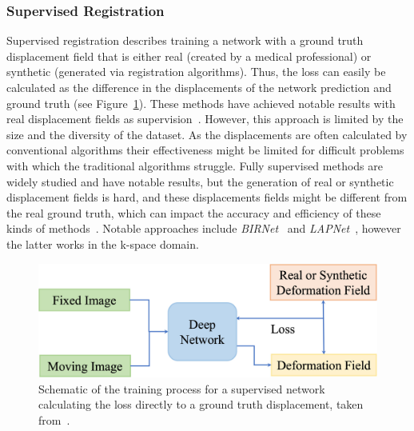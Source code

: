 \subsubsection{Supervised Registration} \label{SubSubSec:SupervisedRegistration}
Supervised registration describes training a network with a ground truth displacement field that is either real (created by a medical professional) or synthetic (generated via registration algorithms). Thus, the loss can easily be calculated as the difference in the displacements of the network prediction and ground truth (see Figure~\ref{fig:SupervisedRegistration}). These methods have achieved notable results with real displacement fields as supervision~\cite{Zou2022}. However, this approach is limited by the size and the diversity of the dataset. As the displacements are often calculated by conventional algorithms their effectiveness might be limited for difficult problems with which the traditional algorithms struggle. Fully supervised methods are widely studied and have notable results, but the generation of real or synthetic displacement fields is hard, and these displacements fields might be different from the real ground truth, which can impact the accuracy and efficiency of these kinds of methods~\cite{Zou2022}. Notable approaches include \emph{BIRNet}~\cite{BIRNet} and \emph{LAPNet}~\cite{LAPNet}, however the latter works in the k-space domain.

\begin{figure}[h] %
	\centering
	\graphicspath{{images/}{\main/images/}}
	\includegraphics[width=\linewidth]{SupervisedRegistrationGraph.jpg} 
	\caption{Schematic of the training process for a supervised network calculating the loss directly to a ground truth displacement, taken from~\cite{Zou2022}.}
	\label{fig:SupervisedRegistration}
\end{figure}


